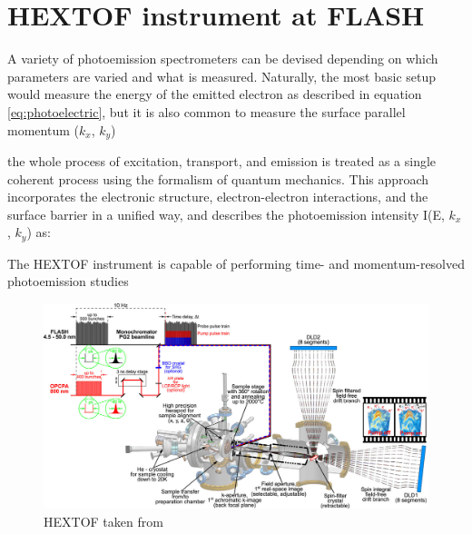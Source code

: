 \section{HEXTOF instrument at FLASH}
A variety of photoemission spectrometers can be devised depending on which parameters are varied and what is measured. Naturally, the most basic setup would measure the energy of the emitted electron as described in equation \ref{eq:photoelectric}, but it is also common to measure the surface parallel momentum ($k_x$, $k_y$)

the whole process of excitation, transport, and emission is treated as a single coherent process using the formalism of quantum mechanics. This approach incorporates the electronic structure, electron-electron interactions, and the surface barrier in a unified way, and describes the photoemission intensity  I(E, $k_x$, $k_y$)  as:





The \gls{HEXTOF} instrument is capable of performing time- and momentum-resolved photoemission studies 
\begin{figure}
    \centering
    \includegraphics[width=1\linewidth]{images/2024-08-27-10-50-01.png}
    \caption{HEXTOF taken from \cite{kutnyakhovTimeMomentumresolvedPhotoemission2020}}
\end{figure}

